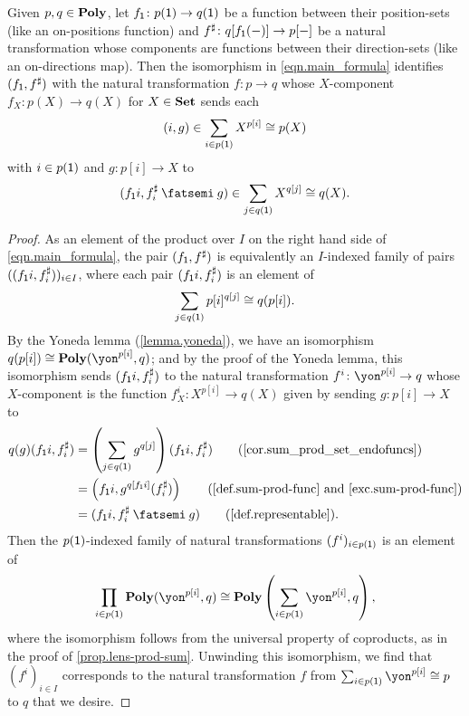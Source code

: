 \documentclass[Book-Poly]{subfiles}
\begin{document}
\begin{proposition} \label{prop.morph_arena_to_func}
Given $p,q\in\mathbf{Poly}$, let $f_{\textsf{1}}\colon p(\textsf{1})\to q(\textsf{1})$ be a function between their position-sets (like an on-positions function) and $f^\sharp\colon q[f_{\textsf{1}}(-)]\to p[-]$ be a natural transformation whose components are functions between their direction-sets (like an on-directions map).
Then the isomorphism in \eqref{eqn.main_formula} identifies $(f_{\textsf{1}},f^\sharp)$ with the natural transformation $f\colon p\to q$ whose $X$-component $f_X\colon p(X)\to q(X)$ for $X\in\mathbf{Set}$ sends each
\[
    (i,g)\in\sum_{i\in p(\textsf{1})} X^{p[i]}\cong p(X)
\]
with $i\in p(\textsf{1})$ and $g\colon p[i]\to X$ to
\[
    (f_\1i,f^\sharp_i\then g)\in\sum_{j\in q(\1)}X^{q[j]}\iso q(X).
\]
\end{proposition}
\begin{proof}
As an element of the product over $I$ on the right hand side of \eqref{eqn.main_formula}, the pair $(f_{\textsf{1}},f^\sharp)$ is equivalently an $I$-indexed family of pairs $((f_{\textsf{1}}i,f^\sharp_i))_{i\in I}$, where each pair $(f_{\textsf{1}}i,f^\sharp_i)$ is an element of
\[
    \sum_{j\in q(\textsf{1})}p[i]^{q[j]}\cong q(p[i]).
\]
By the Yoneda lemma (\cref{lemma.yoneda}), we have an isomorphism $q(p[i])\iso\poly(\yon^{p[i]}, q)$; and by the proof of the Yoneda lemma, this isomorphism sends $(f_{\textsf{1}}i, f^\sharp_i)$ to the natural transformation $f^i\colon\yon^{p[i]} \to q$ whose $X$-component is the function $f^i_X\colon X^{p[i]}\to q(X)$ given by sending $g\colon p[i]\to X$ to
\begin{align*}
    q(g)(f_\1i, f^\sharp_i) &= \left(\sum_{j \in q(\1)} g^{q[j]}\right)(f_\1i, f^\sharp_i) \tag{\cref{cor.sum_prod_set_endofuncs}} \\
    &= \left(f_\1i, g^{q[f_\1i]}(f^\sharp_i)\right) \tag{\cref{def.sum-prod-func} and \cref{exc.sum-prod-func}} \\
    &= (f_\1i, f^\sharp_i\then g) \tag{\cref{def.representable}}.
\end{align*}
Then the $p(\textsf{1})$-indexed family of natural transformations $(f^i)_{i\in p(\textsf{1})}$ is an element of
\[
  \prod_{i\in p(\1)}\poly(\yon^{p[i]}, q)\iso\poly\left(\sum_{i\in p(\1)}\yon^{p[i]},q\right),
\]
where the isomorphism follows from the universal property of coproducts, as in the proof of \cref{prop.lens-prod-sum}.
Unwinding this isomorphism, we find that $(f^i)_{i\in I}$ corresponds to the natural transformation $f$ from $\sum_{i\in p(\1)}\yon^{p[i]}\iso p$ to $q$ that we desire.
\end{proof}
\end{document}
